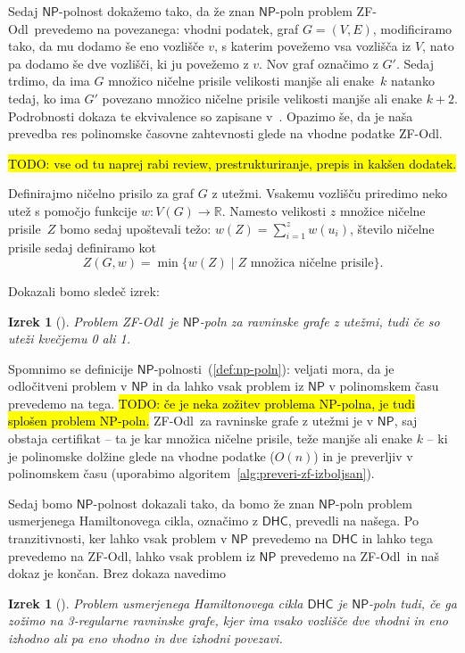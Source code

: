 \documentclass[12pt,a4paper,twoside]{article}
\theoremstyle{definition} %
\theoremstyle{plain} %
\newtheorem{izrek}[definicija]{Izrek}
\numberwithin{equation}{section}  %
\newcommand{\R}{\mathbb R}
\newcommand{\NP}{\ensuremath{\mathsf{NP}}}
\newcommand{\DHC}{\ensuremath{\mathsf{DHC}}}
\newcommand{\ZFOdl}{\textsf{ZF-Odl}}
\begin{document}
Sedaj $\NP$-polnost dokažemo tako, da že znan $\NP$-poln problem \ZFOdl\ prevedemo na povezanega: vhodni podatek, graf $G = (V,E)$, modificiramo tako, da mu dodamo še eno vozlišče $v$, s katerim povežemo vsa vozlišča iz $V$, nato pa dodamo še dve vozlišči, ki ju povežemo z $v$. Nov graf označimo z $G'$. Sedaj trdimo, da ima $G$ množico ničelne prisile velikosti manjše ali enake~$k$ natanko tedaj, ko ima $G'$ povezano množico ničelne prisile velikosti manjše ali enake $k + 2$. Podrobnosti dokaza te ekvivalence so zapisane v~\cite{brimkov2017complexity}. Opazimo še, da je naša prevedba res polinomske časovne zahtevnosti glede na vhodne podatke \ZFOdl.

\hl{TODO: vse od tu naprej rabi review, prestrukturiranje, prepis in kakšen dodatek.}

Definirajmo ničelno prisilo za graf $G$ z utežmi. Vsakemu vozlišču priredimo neko utež s pomočjo funkcije $w\colon V(G) \rightarrow \R$. Namesto velikosti $z$ množice ničelne prisile~$Z$ bomo sedaj upoštevali težo: $w(Z) = \sum_{i=1}^{z} w(u_i)$, število ničelne prisile sedaj definiramo kot
\[ Z(G, w) = \min\{ w(Z) \mid Z \text{ množica ničelne prisile} \} .\]

Dokazali bomo sledeč izrek:
\begin{izrek}[\cite{aazami2008hardness}]
    Problem \ZFOdl\ je $\NP$-poln za ravninske grafe z utežmi, tudi če so uteži kvečjemu 0 ali 1.
\end{izrek}
Spomnimo se definicije $\NP$-polnosti~(\ref{def:np-poln}): veljati mora, da je odločitveni problem v $\NP$ in da lahko vsak problem iz $\NP$ v polinomskem času prevedemo na tega. \hl{TODO: če je neka zožitev problema NP-polna, je tudi splošen problem NP-poln.} \ZFOdl\ za ravninske grafe z utežmi je v $\NP$, saj obstaja certifikat -- ta je kar množica ničelne prisile, teže manjše ali enake $k$ -- ki je polinomske dolžine glede na vhodne podatke ($O(n)$) in je preverljiv v polinomskem času (uporabimo algoritem~\ref{alg:preveri-zf-izboljsan}). 

Sedaj bomo $\NP$-polnost dokazali tako, da bomo že znan $\NP$-poln problem usmerjenega Hamiltonovega cikla, označimo z $\DHC$, prevedli na našega. Po tranzitivnosti, ker lahko vsak problem v $\NP$ prevedemo na $\DHC$ in lahko tega prevedemo na \ZFOdl, lahko vsak problem iz $\NP$ prevedemo na \ZFOdl\ in naš dokaz je končan. Brez dokaza navedimo
\begin{izrek}[\cite{plesnik1979np}]
    \label{izr:dhc}
    Problem usmerjenega Hamiltonovega cikla $\DHC$ je $\NP$-poln tudi, če ga zožimo na 3-regularne ravninske grafe, kjer ima vsako vozlišče dve vhodni in eno izhodno ali pa eno vhodno in dve izhodni povezavi.
\end{izrek}
\end{document}
